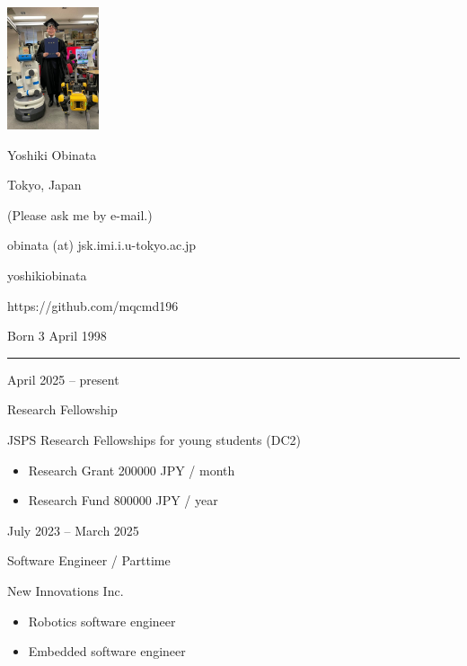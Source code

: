 \documentclass[a4paper,10pt]{article}
\newlength{\cvcolumngapwidth}
\newlength{\cvleftcolumnwidth}
\newlength{\cvrightcolumnwidth}
\newcommand{\cvnamestyle}[1]{{\Large\cvnamefont\textcolor{cvnamecolor}{#1}}}
\newcommand{\cvsectionstyle}[1]{{\normalsize\cvsectionfont\textcolor{cvsectioncolor}{#1}}}
\newcommand{\cvtitlestyle}[1]{{\large\cvtitlefont\textcolor{cvtitlecolor}{#1}}}
\newcommand{\cvdurationstyle}[1]{{\small\cvdurationfont\textcolor{cvdurationcolor}{#1}}}
\newlength{\cvafteritemskipamount}
\newlength{\cvaftersectionskipamount}
\newlength{\cvafternameskipamount}
\newlength{\cvafterpersonalinfolineskipamount}
\newlength{\cvaftertitleskipamount}
\newlength{\cvparskip}
\newcommand{\cvpersonalinfo}[2]{
    \begin{minipage}[t]{\cvleftcolumnwidth}
        \vspace{0mm} %
        \raggedleft #1
    \end{minipage}%
    \hspace{\cvcolumngapwidth}%
    \begin{minipage}[t]{\cvrightcolumnwidth}
        \vspace{0mm} %
        #2
    \end{minipage}

    \vspace{\cvafteritemskipamount}
}
\newcommand{\cvname}[1]{
    \cvnamestyle{#1}

    \vspace{\cvafternameskipamount}
}
\newcommand{\cvpersonalinfolinewithicon}[3]{
    \raisebox{.5\fontcharht\font`E-.5\height}{\texttt{[image: \#2]}}
    #3

    \vspace{\cvafterpersonalinfolineskipamount}
}
\newcommand{\cvsection}[1]{
    \begin{minipage}[t]{\cvleftcolumnwidth}
        \raggedleft\cvsectionstyle{#1}
    \end{minipage}%
    \hspace{\cvcolumngapwidth}%
    \begin{minipage}[t]{\cvrightcolumnwidth}
        \textcolor{cvrulecolor}{\rule{\cvrightcolumnwidth}{0.3mm}}
    \end{minipage}

    \vspace{\cvaftersectionskipamount}
}
\newcommand{\cvitem}[2]{
    \begin{minipage}[t]{\cvleftcolumnwidth}
        \raggedleft #1
    \end{minipage}%
    \hspace{\cvcolumngapwidth}%
    \begin{minipage}[t]{\cvrightcolumnwidth}
        \setlength{\parskip}{\cvparskip} #2
    \end{minipage}

    \vspace{\cvafteritemskipamount}
}
\newcommand{\cvtitle}[1]{
    \cvtitlestyle{#1}

    \vspace{\cvaftertitleskipamount}
    \vspace{-\cvparskip}
}
\begin{document}

\cvpersonalinfo{
    \includegraphics[height=36mm]{resources/photo.jpg}
}{
    \cvname{Yoshiki Obinata}

    \cvpersonalinfolinewithicon{height=4mm}{resources/IcoMoon-Free-PDF/072-location.pdf}{
        Tokyo, Japan
    }

    \cvpersonalinfolinewithicon{height=4mm}{resources/IcoMoon-Free-PDF/067-phone.pdf}{
        (Please ask me by e-mail.)
    }

    \cvpersonalinfolinewithicon{height=4mm}{resources/IcoMoon-Free-PDF/070-envelop.pdf}{
        obinata (at) jsk.imi.i.u-tokyo.ac.jp
    }

    \cvpersonalinfolinewithicon{height=4mm}{resources/IcoMoon-Free-PDF/458-linkedin.pdf}{
        yoshikiobinata
    }

    \cvpersonalinfolinewithicon{height=4mm}{resources/IcoMoon-Free-PDF/433-github.pdf}{
        https://github.com/mqcmd196
    }

    Born 3 April 1998
}



\cvsection{WORK EXPERIENCE}

\cvitem{
  \cvdurationstyle{April 2025 -- present}
}{
  \cvtitle{Research Fellowship}

  JSPS Research Fellowships for young students (DC2)

  \begin{itemize}[leftmargin=*]
  \item Research Grant 200000 JPY / month
  \item Research Fund 800000 JPY / year
  \end{itemize}
}

\cvitem{
  \cvdurationstyle{July 2023 -- March 2025}
}{
  \cvtitle{Software Engineer / Parttime}

  New Innovations Inc.

  \begin{itemize}[leftmargin=*]
  \item Robotics software engineer
  \item Embedded software engineer
  \end{itemize}
}
\end{document}
